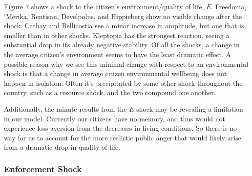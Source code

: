 \documentclass[12pt]{article}
\begin{document}
\begin{spacing}{1.5}
\begin{figure}
\end{figure}


Figure 7 shows a shock to the citizen's environment/quality of life, $E$. Freedonia, `Merika, Rentisan, Develpolus, and Hippieberg show no visible change after the shock. Cathay and Bellicostia see a minor increase in amplitude, but one that is smaller than in other shocks. Kleptopia has the strongest reaction, seeing a substantial drop in its already negative stability. Of all the shocks, a change in the average citizen's environment seems to have the least dramatic effect. A possible reason why we see this minimal change with respect to an environmental shock is that a change in average citizen environmental wellbeing does not happen in isolation. Often it's precipitated by some other shock throughout the country, such as a resource shock, and the two compound one another. 

Additionally, the minute results from the $E$ shock may be revealing a limitation in our model. Currently our citizens have no memory, and thus would not experience loss aversion from the decreases in living conditions. So there is no way for us to account for the more realistic public anger that would likely arise from a dramatic drop in quality of life. 


\subsubsection{Enforcement Shock}


\end{spacing}
\end{document}
